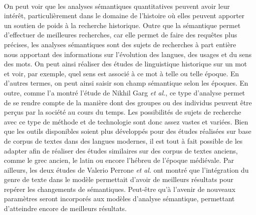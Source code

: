 \documentclass{article}
\begin{document}
\paragraph{}
On peut voir que les analyses sémantiques quantitatives peuvent avoir leur intérêt, particulièrement dans le domaine de l’histoire où elles peuvent apporter un soutien de poids à la recherche historique. Outre que la sémantique permet d'effectuer de meilleures recherches, car elle permet de faire des requêtes plus précises, les analyses sémantiques sont des sujets de recherches à part entière nous apportant des informations sur l’évolution des langues, des usages et du sens des mots. On peut ainsi réaliser des études de linguistique historique sur un mot et voir, par exemple, quel sens est associé à ce mot à telle ou telle époque. En d'autres termes, on peut ainsi saisir son champ sémantique selon les époques. En outre, comme l’a montré l’étude de Nikhil Garg \textit{et al.}, ce type d’analyse permet de se rendre compte de la manière dont des groupes ou des individus peuvent être perçus par la société au cours du temps. Les possibilités de sujets de recherche avec ce type de méthode et de technologie sont donc assez vastes et variées. Bien que les outils disponibles soient plus développés pour des études réalisées sur base de corpus de textes dans des langues modernes, il est tout à fait possible de les adapter afin de réaliser des études similaires sur des corpus de textes anciens, comme le grec ancien, le latin ou encore l’hébreu de l’époque médiévale. Par ailleurs, les deux études de Valerio Perrone \textit{et al.} ont montré que l’intégration du genre de texte dans le modèle permettait d’avoir de meilleurs résultats pour repérer les changements de sémantiques. Peut-être qu’à l’avenir de nouveaux paramètres seront incorporés aux modèles d’analyse sémantique, permettant d’atteindre encore de meilleurs résultats. 


\end{document}
